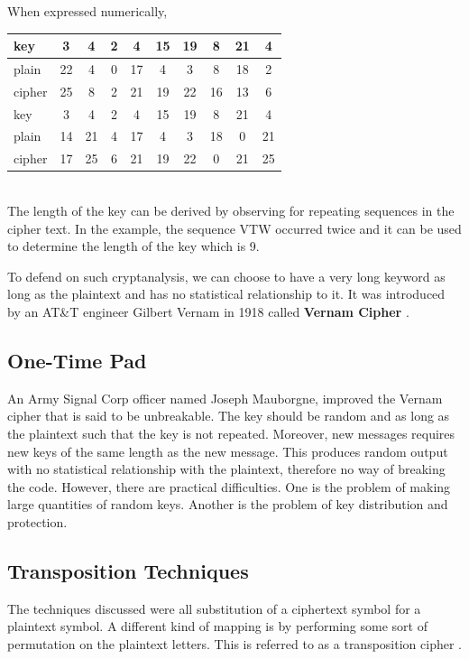 \documentclass{article}
\begin{document}
When expressed numerically,
\\
\begin{tabular}{| l *{9}{|c} |}
\hline
key & 3 & 4 & 2 & 4 & 15 & 19 & 8 & 21 & 4\\
\hline
plain & 22 & 4 & 0 & 17 & 4 & 3 & 8 & 18 & 2\\
\hline
cipher & 25 & 8 & 2 & 21 & 19 & 22 & 16 & 13 & 6\\
\hline
\hline
key & 3 & 4 & 2 & 4 & 15 & 19 & 8 & 21 & 4\\
\hline
plain & 14 & 21 & 4 & 17 & 4 & 3 & 18 & 0 & 21\\
\hline
cipher & 17 & 25 & 6 & 21 & 19 & 22 & 0 & 21 & 25\\
\hline
\end{tabular}
\\

The length of the key can be derived by observing for repeating sequences in the cipher text. In the example, the sequence VTW occurred twice and it can be used to determine the length of the key which is 9.

To defend on such cryptanalysis, we can choose to have a very long keyword as long as the plaintext and has no statistical relationship to it. It was introduced by an AT\&T engineer Gilbert Vernam in 1918 called \textbf{Vernam Cipher} \cite{stallings2011}.

\subsection{One-Time Pad}
An Army Signal Corp officer named Joseph Mauborgne, improved the Vernam cipher that is said to be unbreakable. The key should be random and as long as the plaintext such that the key is not repeated. Moreover, new messages requires new keys of the same length as the new message. This produces random output with no statistical relationship with the plaintext, therefore no way of breaking the code. However, there are practical difficulties. One is the problem of making large quantities of random keys. Another is the problem of key distribution and protection.

\subsection{Transposition Techniques}
The techniques discussed were all substitution of a ciphertext symbol for a plaintext symbol. A different kind of mapping is by performing some sort of permutation on the plaintext letters. This is referred to as a transposition cipher \cite{stallings2011}.
\end{document}
